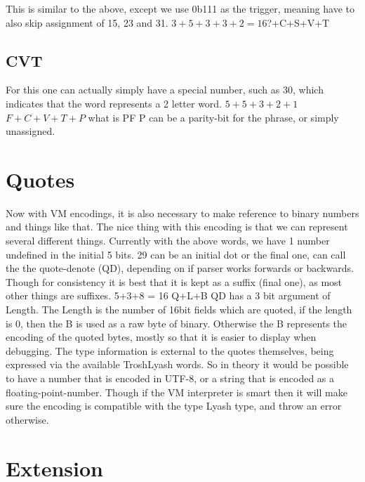 \documentclass[12pt]{report}
\begin{document}
This is similar to the above, except we use 0b111 as the trigger,
meaning have to also skip assignment of 15, 23 and 31.
$3+5+3+3+2=16$?+C+S+V+T

\subsection{CVT}\label{cvt}

For this one can actually simply have a special number, such as 30,
which indicates that the word represents a 2 letter word. $5+5+3+2+1$
$F+C+V+T+P$ what is PF P can be a parity-bit for the phrase, or simply
unassigned.

\section{Quotes}\label{quotes}

Now with VM encodings, it is also necessary to make reference to binary
numbers and things like that. The nice thing with this encoding is that
we can represent several different things. Currently with the above
words, we have 1 number undefined in the initial 5 bits. 29 can be an
initial dot or the final one, can call the the quote-denote (QD),
depending on if parser works forwards or backwards. Though for
consistency it is best that it is kept as a suffix (final one), as most
other things are suffixes. 5+3+8 = 16 Q+L+B QD has a 3 bit argument of
Length. The Length is the number of 16bit fields which are quoted, if
the length is 0, then the B is used as a raw byte of binary. Otherwise
the B represents the encoding of the quoted bytes, mostly so that it is
easier to display when debugging. The type information is external to
the quotes themselves, being expressed via the available TroshLyash
words. So in theory it would be possible to have a number that is
encoded in UTF-8, or a string that is encoded as a
floating-point-number. Though if the VM interpreter is smart then it
will make sure the encoding is compatible with the type Lyash type, and
throw an error otherwise.

\section{Extension}\label{extension}
\end{document}
